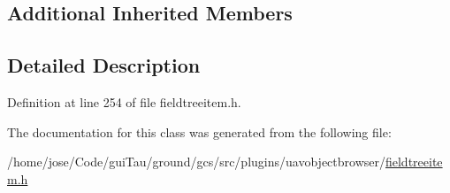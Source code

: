 \subsection*{Additional Inherited Members}


\subsection{Detailed Description}


Definition at line 254 of file fieldtreeitem.\-h.



The documentation for this class was generated from the following file\-:\begin{DoxyCompactItemize}
\item 
/home/jose/\-Code/gui\-Tau/ground/gcs/src/plugins/uavobjectbrowser/\hyperlink{fieldtreeitem_8h}{fieldtreeitem.\-h}\end{DoxyCompactItemize}
